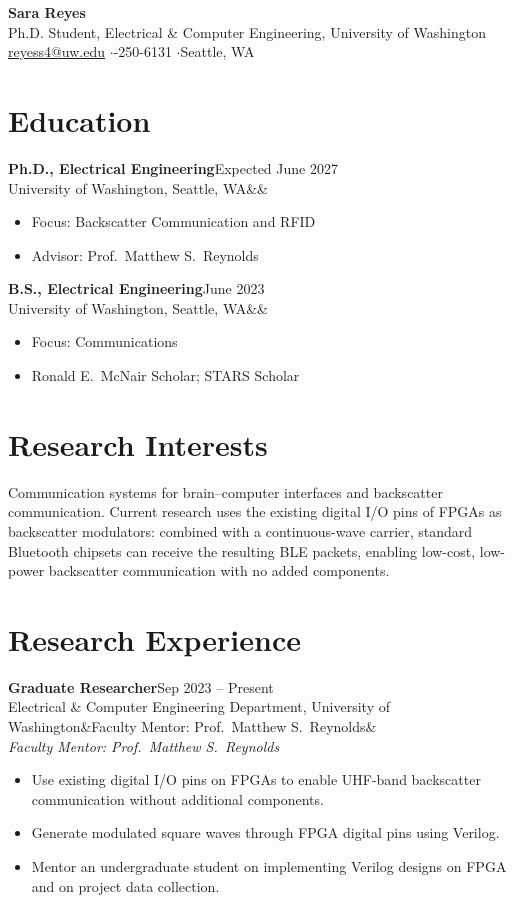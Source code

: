 \documentclass[11pt,letterpaper]{article}
\newcommand{\cventry}[4]{%
  \textbf{#1}\hfill #2\\
  #3\ifx&#4&\else\\ \textit{#4}\fi\par\vspace{2pt}}
\begin{document}
\begin{center}
  {\LARGE\bfseries Sara Reyes}\\[4pt]
  Ph.D. Student, Electrical \& Computer Engineering, University of Washington\\[2pt]
  \href{mailto:reyess4@uw.edu}{reyess4@uw.edu} \quad$\cdot$-250-6131 \quad$\cdot$\quad Seattle, WA
\end{center}

\section{Education}
\cventry{Ph.D., Electrical Engineering}{Expected June 2027}
        {University of Washington, Seattle, WA}{}
\begin{itemize}
  \item Focus: Backscatter Communication and RFID
  \item Advisor: Prof.\ Matthew S.\ Reynolds
\end{itemize}

\cventry{B.S., Electrical Engineering}{June 2023}
        {University of Washington, Seattle, WA}{}
\begin{itemize}
  \item Focus: Communications
  \item Ronald E.\ McNair Scholar; STARS Scholar
\end{itemize}

\section{Research Interests}
Communication systems for brain--computer interfaces and backscatter communication. Current
research uses the existing digital I/O pins of FPGAs as backscatter modulators: combined with a
continuous-wave carrier, standard Bluetooth chipsets can receive the resulting BLE packets,
enabling low-cost, low-power backscatter communication with no added components.

\section{Research Experience}
\cventry{Graduate Researcher}{Sep 2023 -- Present}
        {Electrical \& Computer Engineering Department, University of Washington}
        {Faculty Mentor: Prof.\ Matthew S.\ Reynolds}
\begin{itemize}
  \item Use existing digital I/O pins on FPGAs to enable UHF-band backscatter communication without additional components.
  \item Generate modulated square waves through FPGA digital pins using Verilog.
  \item Mentor an undergraduate student on implementing Verilog designs on FPGA and on project data collection.
\end{itemize}
\end{document}
